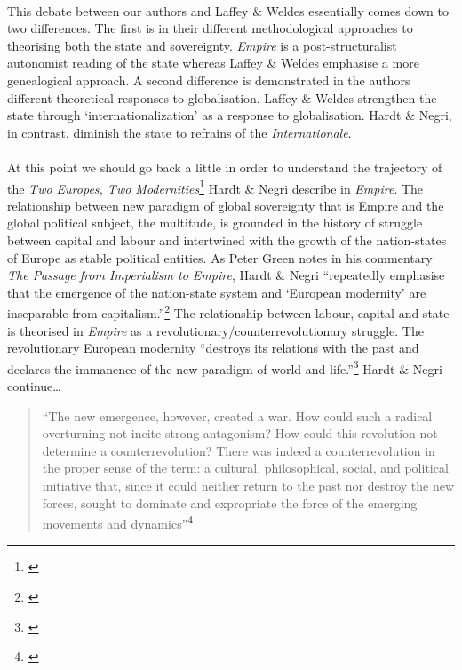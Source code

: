 \documentclass[12pt,a4paper,titlepage]{article}
\begin{document}
\paragraph{}This debate between our authors and Laffey \& Weldes essentially comes down to two differences. The first is in their different methodological approaches to theorising both the state and sovereignty. \textit{Empire} is a post-structuralist autonomist reading of the state whereas Laffey \& Weldes emphasise a more genealogical approach. A second difference is demonstrated in the authors different theoretical responses to globalisation. Laffey \& Weldes strengthen the state through `internationalization' as a response to globalisation. Hardt \& Negri, in contrast, diminish the state to refrains of the \textit{Internationale}.

\paragraph{}At this point we should go back a little in order to understand the trajectory of the \textit{Two Europes, Two Modernities}\footnote{\cite[Ch. 2.1 pp. 69-92]{Hardt:2001jl}} Hardt \& Negri describe in \textit{Empire}. The relationship between new paradigm of global sovereignty that is Empire and the global political subject, the multitude, is grounded in the history of struggle between capital and labour and intertwined with the growth of the nation-states of Europe as stable political entities. As Peter Green notes in his commentary \textit{The Passage from Imperialism to Empire}, Hardt \& Negri ``repeatedly emphasise that the emergence of the nation-state system and `European modernity' are inseparable from capitalism.''\footnote{\cite[p. 37]{green:2002em}} The relationship between labour, capital and state is theorised in \textit{Empire} as a revolutionary/counterrevolutionary struggle. The revolutionary European modernity ``destroys its relations with the past and declares the immanence of the new paradigm of world and life.''\footnote{\cite[p. 74]{Hardt:2001jl}} Hardt \& Negri continue\ldots

\begin{quote}
``The new emergence, however, created a war. How could such a radical overturning not incite strong antagonism? How could this revolution not determine a counterrevolution? There was indeed a counterrevolution in the proper sense of the term: a cultural, philosophical, social, and political initiative that, since it could neither return to the past nor destroy the new forces, sought to dominate and expropriate the force of the emerging movements and dynamics''\footnote{\cite[p. 74]{Hardt:2001jl}}
\end{quote}
\end{document}
